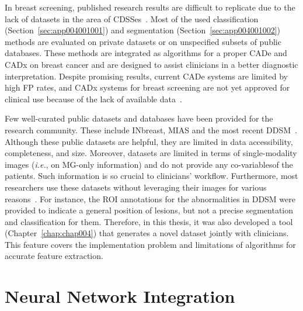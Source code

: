 In breast screening, published research results are difficult to replicate due to the lack of datasets in the area of \acp{CDSSe}~\cite{lee2017curated}.
Most of the used classification (Section~\ref{sec:app004001001}) and segmentation (Section~\ref{sec:app004001002}) methods are evaluated on private datasets or on unspecified subsets of public databases.
These methods are integrated as algorithms for a proper \ac{CADe} and \ac{CADx} on breast cancer and are designed to assist clinicians in a better diagnostic interpretation.
Despite promising results, current \ac{CADe} systems are limited by high \ac{FP} rates, and \ac{CADx} systems for breast screening are not yet approved for clinical use because of the lack of available data~\cite{10.1145/3079765}.

Few well-curated public datasets and databases have been provided for the research community.
These include INbreast, \ac{MIAS} and the most recent \ac{DDSM}~\cite{shen2019deep}.
Although these public datasets are helpful, they are limited in data accessibility, completeness, and size.
Moreover, datasets are limited in terms of single-modality images ({\it i.e.}, on \ac{MG}-only information) and do not provide any co-variables\footnotemark[28] of the patients.
Such information is so crucial to clinicians' workflow.
Furthermore, most researchers use these datasets without leveraging their images for various reasons~\cite{lee2017curated}.
For instance, the \ac{ROI} annotations for the abnormalities in \ac{DDSM} were provided to indicate a general position of lesions, but not a precise segmentation and classification for them.
Therefore, in this thesis, it was also developed a tool (Chapter~\ref{chap:chap004}) that generates a novel dataset jointly with clinicians.
This feature covers the implementation problem and limitations of algorithms for accurate feature extraction.


\section{Neural Network Integration}
\label{sec:app004003}


